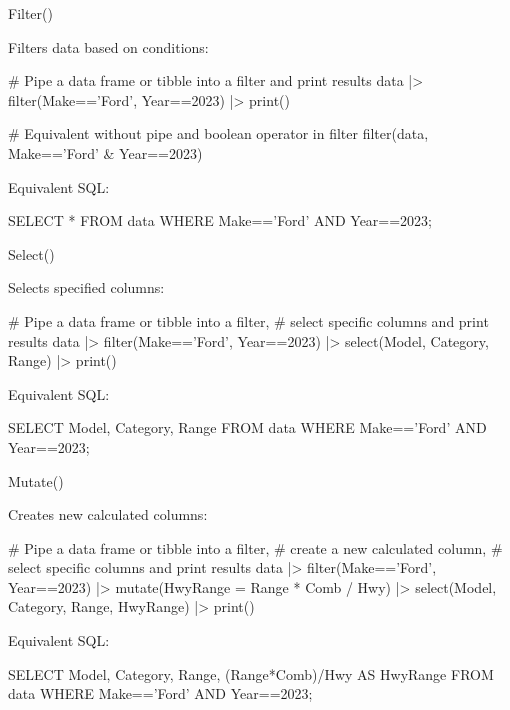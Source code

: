 \documentclass[ignorenonframetext,xcolor=x11names]{beamer}
\begin{document}
\begin{frame}[fragile]{Filter()}

Filters data based on conditions:

\begin{Rcode}
# Pipe a data frame or tibble into a filter and print results
data |> 
  filter(Make=='Ford', Year==2023) |> 
  print()

# Equivalent without pipe and boolean operator in filter
filter(data, Make=='Ford' & Year==2023)
\end{Rcode}

Equivalent SQL:

\begin{sqlcode}
SELECT * 
   FROM data 
   WHERE Make=='Ford' AND Year==2023;
\end{sqlcode}

\end{frame}

\begin{frame}[fragile]{Select()}

Selects specified columns:

\begin{Rcode}
# Pipe a data frame or tibble into a filter,
# select specific columns and print results
data |> 
  filter(Make=='Ford', Year==2023) |> 
  select(Model, Category, Range) |>
  print()
\end{Rcode}

Equivalent SQL:

\begin{sqlcode}
SELECT Model, Category, Range 
   FROM data 
   WHERE Make=='Ford' AND Year==2023;
\end{sqlcode}
\end{frame}

\begin{frame}[fragile]{Mutate()}

Creates new calculated columns:

\begin{Rcode}
# Pipe a data frame or tibble into a filter,
# create a new calculated column,
# select specific columns and print results
data |> 
  filter(Make=='Ford', Year==2023) |> 
  mutate(HwyRange = Range * Comb / Hwy) |>
  select(Model, Category, Range, HwyRange) |>
  print()
\end{Rcode}

Equivalent SQL:

\begin{sqlcode}
SELECT Model, Category, Range, (Range*Comb)/Hwy AS HwyRange 
   FROM data 
   WHERE Make=='Ford' AND Year==2023;
\end{sqlcode}
\end{frame}
\end{document}
